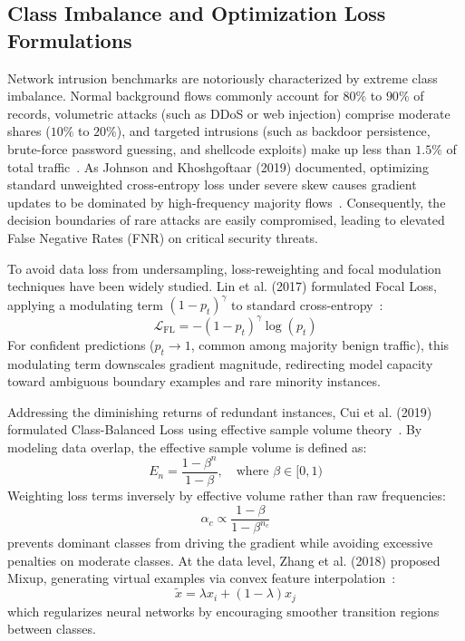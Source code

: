 \documentclass[12pt,a4paper]{report}
\begin{document}
\subsection{Class Imbalance and Optimization Loss Formulations}
Network intrusion benchmarks are notoriously characterized by extreme class imbalance. Normal background flows commonly account for $80\%$ to $90\%$ of records, volumetric attacks (such as DDoS or web injection) comprise moderate shares ($10\%$ to $20\%$), and targeted intrusions (such as backdoor persistence, brute-force password guessing, and shellcode exploits) make up less than $1.5\%$ of total traffic~\cite{sarhan2021netflow, alsaedi2020toniot}. As Johnson and Khoshgoftaar (2019) documented, optimizing standard unweighted cross-entropy loss under severe skew causes gradient updates to be dominated by high-frequency majority flows~\cite{johnson2019survey}. Consequently, the decision boundaries of rare attacks are easily compromised, leading to elevated False Negative Rates (FNR) on critical security threats.

To avoid data loss from undersampling, loss-reweighting and focal modulation techniques have been widely studied. Lin et al. (2017) formulated Focal Loss, applying a modulating term $(1 - p_t)^\gamma$ to standard cross-entropy~\cite{lin2017focal}:
\begin{equation}
\mathcal{L}_{\text{FL}} = - (1 - p_t)^\gamma \log(p_t)
\end{equation}
For confident predictions ($p_t \to 1$, common among majority benign traffic), this modulating term downscales gradient magnitude, redirecting model capacity toward ambiguous boundary examples and rare minority instances.

Addressing the diminishing returns of redundant instances, Cui et al. (2019) formulated Class-Balanced Loss using effective sample volume theory~\cite{cui2019cbloss}. By modeling data overlap, the effective sample volume is defined as:
\begin{equation}
E_n = \frac{1 - \beta^n}{1 - \beta}, \quad \text{where } \beta \in [0, 1)
\end{equation}
Weighting loss terms inversely by effective volume rather than raw frequencies:
\begin{equation}
\alpha_c \propto \frac{1 - \beta}{1 - \beta^{n_c}}
\end{equation}
prevents dominant classes from driving the gradient while avoiding excessive penalties on moderate classes. At the data level, Zhang et al. (2018) proposed Mixup, generating virtual examples via convex feature interpolation~\cite{zhang2018mixup}:
\begin{equation}
\tilde{x} = \lambda x_i + (1 - \lambda) x_j
\end{equation}
which regularizes neural networks by encouraging smoother transition regions between classes.
\end{document}
